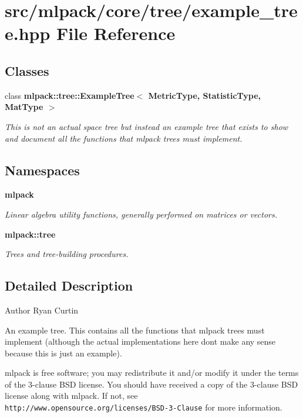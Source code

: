 \section{src/mlpack/core/tree/example\+\_\+tree.hpp File Reference}
\label{example__tree_8hpp}
\subsection*{Classes}
\begin{DoxyCompactItemize}
\item 
class {\bf mlpack\+::tree\+::\+Example\+Tree$<$ Metric\+Type, Statistic\+Type, Mat\+Type $>$}
\begin{DoxyCompactList}\small\item\em This is not an actual space tree but instead an example tree that exists to show and document all the functions that mlpack trees must implement. \end{DoxyCompactList}\end{DoxyCompactItemize}
\subsection*{Namespaces}
\begin{DoxyCompactItemize}
\item 
 {\bf mlpack}
\begin{DoxyCompactList}\small\item\em Linear algebra utility functions, generally performed on matrices or vectors. \end{DoxyCompactList}\item 
 {\bf mlpack\+::tree}
\begin{DoxyCompactList}\small\item\em Trees and tree-\/building procedures. \end{DoxyCompactList}\end{DoxyCompactItemize}


\subsection{Detailed Description}
\begin{DoxyAuthor}{Author}
Ryan Curtin
\end{DoxyAuthor}
An example tree. This contains all the functions that mlpack trees must implement (although the actual implementations here don\textquotesingle{}t make any sense because this is just an example).

mlpack is free software; you may redistribute it and/or modify it under the terms of the 3-\/clause B\+SD license. You should have received a copy of the 3-\/clause B\+SD license along with mlpack. If not, see {\tt http\+://www.\+opensource.\+org/licenses/\+B\+S\+D-\/3-\/\+Clause} for more information. 
